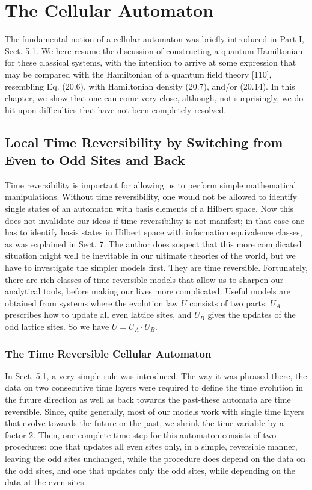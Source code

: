 \documentclass[main.tex]{subfiles}
\begin{document}
\section{The Cellular Automaton}\label{ch21}

The fundamental notion of a cellular automaton was briefly introduced in Part I, Sect. 5.1. We here resume the discussion of constructing a quantum Hamiltonian for these classical systems, with the intention to arrive at some expression that may be compared with the Hamiltonian of a quantum field theory [110], resembling Eq. (20.6), with Hamiltonian density (20.7), and/or (20.14). In this chapter, we show that one can come very close, although, not surprisingly, we do hit upon difficulties that have not been completely resolved.


\subsection{Local Time Reversibility by Switching from Even to Odd Sites and Back}\label{ch21.1}

Time reversibility is important for allowing us to perform simple mathematical manipulations. Without time reversibility, one would not be allowed to identify single states of an automaton with basis elements of a Hilbert space. Now this does not invalidate our ideas if time reversibility is not manifest; in that case one has to identify basis states in Hilbert space with information equivalence classes, as was explained in Sect. 7. The author does suspect that this more complicated situation might well be inevitable in our ultimate theories of the world, but we have to investigate the simpler models first. They are time reversible. Fortunately, there are rich classes of time reversible models that allow us to sharpen our analytical tools, before making our lives more complicated. Useful models are obtained from systems where the evolution law $U$ consists of two parts: $U_A$ prescribes how to update all even lattice sites, and $U_B$ gives the updates of the odd lattice sites. So we have $U = U_A \cdot U_B$.


\subsubsection{The Time Reversible Cellular Automaton}\label{ch21.1.1}

In Sect. 5.1, a very simple rule was introduced. The way it was phrased there, the data on two consecutive time layers were required to define the time evolution in the future direction as well as back towards the past-these automata are time reversible. Since, quite generally, most of our models work with single time layers that evolve towards the future or the past, we shrink the time variable by a factor 2. Then, one complete time step for this automaton consists of two procedures: one that updates all even sites only, in a simple, reversible manner, leaving the odd sites unchanged, while the procedure does depend on the data on the odd sites, and one that updates only the odd sites, while depending on the data at the even sites. 
\end{document}

